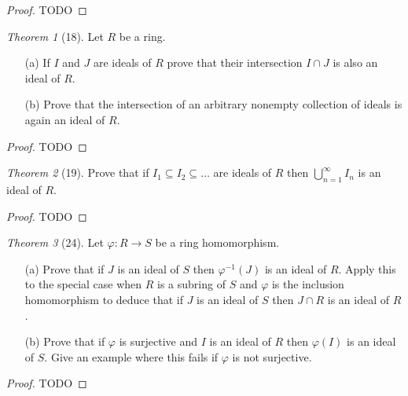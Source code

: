 \documentclass[12pt]{article}
\theoremstyle{remark}
\theoremstyle{named}
\newtheorem*{theorem}{Theorem}
\begin{document}
\begin{proof}
    TODO
\end{proof}


\begin{theorem}[18]
    Let \(R\) be a ring.
    \begin{enumerate}
        \item[(a)] If \(I\) and \(J\) are ideals of \(R\) prove that their intersection \(I \cap J\) is also an ideal of \(R\). 
        \item[(b)] Prove that the intersection of an arbitrary nonempty collection of ideals is again an ideal of \(R\). 
    \end{enumerate}
\end{theorem}

\begin{proof}
    TODO
\end{proof}


\begin{theorem}[19]
    Prove that if \(I_1 \subseteq I_2 \subseteq \dots\) are ideals of \(R\) then \(\bigcup_{n = 1}^\infty I_n\) is an ideal of \(R\).
\end{theorem}

\begin{proof}
    TODO
\end{proof}


\begin{theorem}[24]
    Let \(\varphi : R \to S\) be a ring homomorphism.
    \begin{enumerate}
        \item[(a)] Prove that if \(J\) is an ideal of \(S\) then \(\varphi^{-1}(J)\) is an ideal of \(R\). Apply this to the special case when \(R\) is a subring of \(S\) and \(\varphi\) is the inclusion homomorphism to deduce that if \(J\) is an ideal of \(S\) then \(J \cap R\) is an ideal of \(R\). 
        \item[(b)] Prove that if \(\varphi\) is surjective and \(I\) is an ideal of \(R\) then \(\varphi(I)\) is an ideal of \(S\). Give an example where this fails if \(\varphi\) is not surjective.
    \end{enumerate}
\end{theorem}

\begin{proof}
    TODO
\end{proof}
\end{document}
